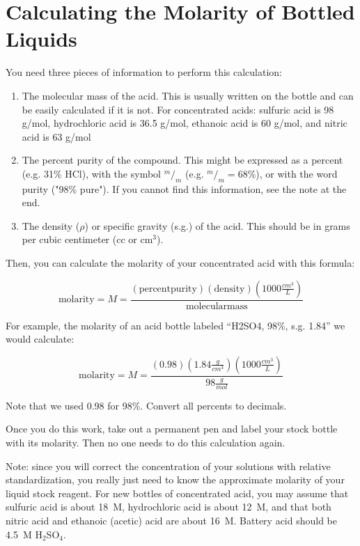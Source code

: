\chapter{Calculating the Molarity of Bottled Liquids}
\label{cha:bottlemolarity}

You need three pieces of information to perform this calculation:

\begin{enumerate}

\item{The molecular mass of the acid. This is usually written on the bottle and can be easily calculated if it is not. For concentrated acids: sulfuric acid is 98 g/mol, hydrochloric acid is 36.5 g/mol, ethanoic acid is 60 g/mol, and nitric acid is 63 g/mol}

\item{The percent purity of the compound. This might be expressed as a percent (e.g. 31\% HCl), with the symbol $ ^m/_m $ (e.g. $ ^m/_m = 68\% $), or with the word purity ("98\% pure"). If you cannot find this information, see the note at the end.}

\item{The density ($\rho$) or specific gravity (s.g.) of the acid. This should be in grams per cubic centimeter (cc or $\mathrm{cm}^3$).}

\end{enumerate}

Then, you can calculate the molarity of your concentrated acid with this formula:

\[ \mathrm{molarity} = M = \frac{(\mathrm{percent purity})(\mathrm{density})(1000 \frac{cm^3}{L})}{\mathrm{molecular mass}} \]

For example, the molarity of an acid bottle labeled “H2SO4, 98\%, s.g. 1.84” we would calculate:

\[ \mathrm{molarity} = M = \frac{(0.98)(1.84 \frac{g}{cm^3})(1000 \frac{cm^3}{L})}{98 \frac{g}{mol} }\]

Note that we used 0.98 for 98\%. Convert all percents to decimals.

Once you do this work, take out a permanent pen and label your stock bottle with its molarity. Then no one needs to do this calculation again.

Note: since you will correct the concentration of your solutions with relative standardization, you really just need to know the approximate molarity of your liquid stock reagent. For new bottles of concentrated acid, you may assume that sulfuric acid is about 18~M, hydrochloric acid is about 12~M, and that both nitric acid and ethanoic (acetic) acid are about 16~M. Battery acid should be 4.5~M $ \mathrm{H}_2 \mathrm{SO}_4 $.
